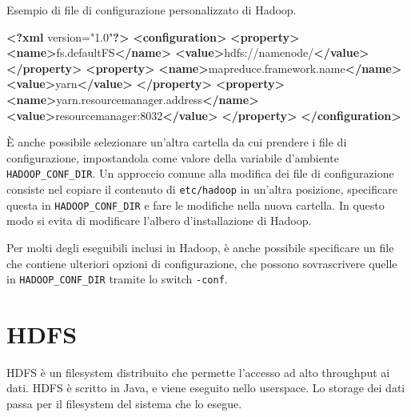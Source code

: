 \documentclass[italian,a4paper, twoside, 12pt]{report}
\newenvironment{Shaded}{}{}
\newcommand{\KeywordTok}[1]{\textcolor[rgb]{0.00,0.44,0.13}{\textbf{#1}}}
\newcommand{\NormalTok}[1]{#1}
\begin{document}
\begin{codelisting}

\caption{Esempio di file di configurazione personalizzato di Hadoop.}

\hypertarget{lst:hadoop-conf-example}{\label{lst:hadoop-conf-example}}
\begin{Shaded}
\begin{Highlighting}[]
\KeywordTok{<?xml}\NormalTok{ version="1.0"}\KeywordTok{?>}
\KeywordTok{<configuration>}
    \KeywordTok{<property>}
        \KeywordTok{<name>}\NormalTok{fs.defaultFS}\KeywordTok{</name>}
        \KeywordTok{<value>}\NormalTok{hdfs://namenode/}\KeywordTok{</value>}
    \KeywordTok{</property>}
    \KeywordTok{<property>}
        \KeywordTok{<name>}\NormalTok{mapreduce.framework.name}\KeywordTok{</name>}
        \KeywordTok{<value>}\NormalTok{yarn}\KeywordTok{</value>}
    \KeywordTok{</property>}
    \KeywordTok{<property>}
        \KeywordTok{<name>}\NormalTok{yarn.resourcemanager.address}\KeywordTok{</name>}
        \KeywordTok{<value>}\NormalTok{resourcemanager:8032}\KeywordTok{</value>}
    \KeywordTok{</property>}
\KeywordTok{</configuration>}
\end{Highlighting}
\end{Shaded}

\end{codelisting}

È anche possibile selezionare un'altra cartella da cui prendere i file
di configurazione, impostandola come valore della variabile d'ambiente
\texttt{HADOOP\_CONF\_DIR}. Un approccio comune alla modifica dei file
di configurazione consiste nel copiare il contenuto di
\texttt{etc/hadoop} in un'altra posizione, specificare questa in
\texttt{HADOOP\_CONF\_DIR} e fare le modifiche nella nuova cartella. In
questo modo si evita di modificare l'albero d'installazione di Hadoop.

Per molti degli eseguibili inclusi in Hadoop, è anche possibile
specificare un file che contiene ulteriori opzioni di configurazione,
che possono sovrascrivere quelle in \texttt{HADOOP\_CONF\_DIR} tramite
lo switch \texttt{-conf}.

\section{HDFS}\label{hdfs}

HDFS è un filesystem distribuito che permette l'accesso ad alto
throughput ai dati. HDFS è scritto in Java, e viene eseguito nello
userspace. Lo storage dei dati passa per il filesystem del sistema che
lo esegue.
\end{document}
